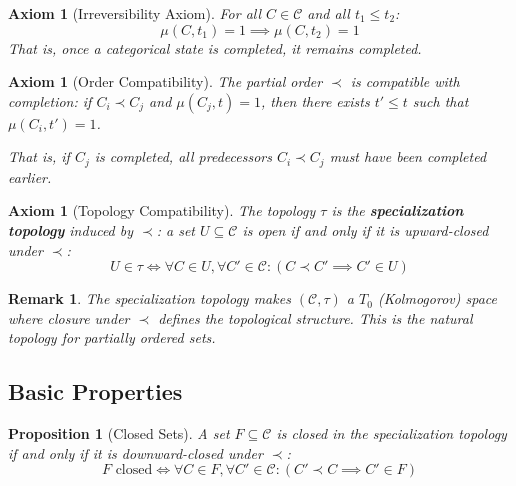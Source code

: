 \documentclass[12pt,a4paper]{article}
\newtheorem{proposition}[theorem]{Proposition}
\newtheorem{axiom}[theorem]{Axiom}
\newtheorem{remark}[theorem]{Remark}
\begin{document}
\begin{axiom}[Irreversibility Axiom]
\label{axiom:irreversibility}
For all $C \in \mathcal{C}$ and all $t_1 \leq t_2$:
\begin{equation}
\mu(C, t_1) = 1 \implies \mu(C, t_2) = 1
\end{equation}
That is, once a categorical state is completed, it remains completed.
\end{axiom}

\begin{axiom}[Order Compatibility]
\label{axiom:order_compatibility}
The partial order $\prec$ is compatible with completion: if $C_i \prec C_j$ and $\mu(C_j, t) = 1$, then there exists $t' \leq t$ such that $\mu(C_i, t') = 1$.

That is, if $C_j$ is completed, all predecessors $C_i \prec C_j$ must have been completed earlier.
\end{axiom}

\begin{axiom}[Topology Compatibility]
\label{axiom:topology_compatibility}
The topology $\tau$ is the \textbf{specialization topology} induced by $\prec$: a set $U \subseteq \mathcal{C}$ is open if and only if it is upward-closed under $\prec$:
\begin{equation}
U \in \tau \iff \forall C \in U, \forall C' \in \mathcal{C}: (C \prec C' \implies C' \in U)
\end{equation}
\end{axiom}

\begin{remark}
The specialization topology makes $(\mathcal{C}, \tau)$ a $T_0$ (Kolmogorov) space where closure under $\prec$ defines the topological structure. This is the natural topology for partially ordered sets.
\end{remark}

\subsection{Basic Properties}

\begin{proposition}[Closed Sets]
\label{prop:closed_sets}
A set $F \subseteq \mathcal{C}$ is closed in the specialization topology if and only if it is downward-closed under $\prec$:
\begin{equation}
F \text{ closed} \iff \forall C \in F, \forall C' \in \mathcal{C}: (C' \prec C \implies C' \in F)
\end{equation}
\end{proposition}
\end{document}
